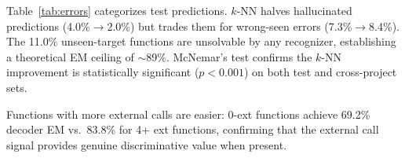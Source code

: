 \documentclass[sigconf,nonacm]{acmart}
\begin{document}
\begin{table}[t]
    \centering
    \caption{Error categorization on the test set (8,973 functions).}
    \label{tab:errors}
\end{table}

Table~\ref{tab:errors} categorizes test predictions. $k$-NN halves hallucinated predictions (4.0\%$\to$2.0\%) but trades them for wrong-seen errors (7.3\%$\to$8.4\%). The 11.0\% unseen-target functions are unsolvable by any recognizer, establishing a theoretical EM ceiling of ${\sim}$89\%. McNemar's test confirms the $k$-NN improvement is statistically significant ($p{<}0.001$) on both test and cross-project sets.

Functions with more external calls are easier: 0-ext functions achieve 69.2\% decoder EM vs.\ 83.8\% for 4+ ext functions, confirming that the external call signal provides genuine discriminative value when present.

\begin{table}[t]
    \centering
    \caption{Test EM by number of external calls per function.}
    \label{tab:ext_buckets}
\end{table}
\end{document}
